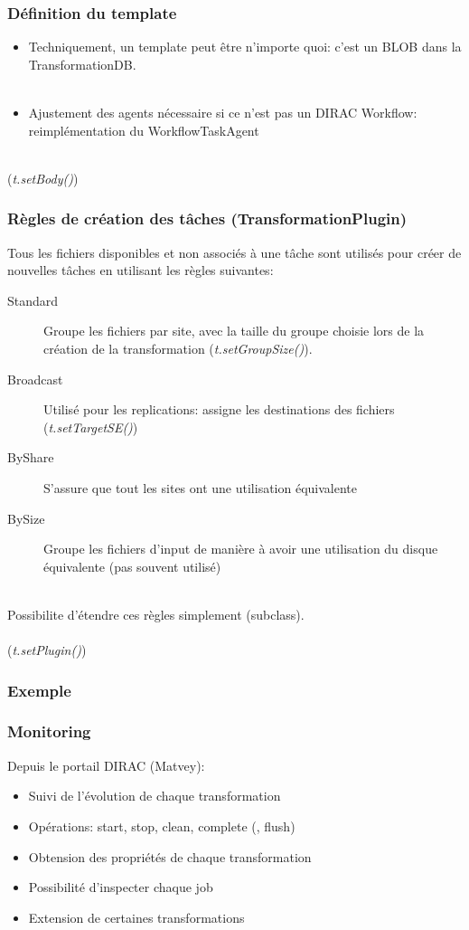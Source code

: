 \documentclass[10pt,table,dvipsnames]{beamer}
\begin{document}
\begin{frame}
  \frametitle{D\'efinition du template}
  \begin{itemize}
  \item Techniquement, un template peut \^etre n'importe quoi: c'est un BLOB
dans la TransformationDB. \\
~\\
  \item Ajustement des agents n\'ecessaire si ce n'est pas un DIRAC
    Workflow: reimpl\'ementation du WorkflowTaskAgent
  \end{itemize}

~\\

(\emph{t.setBody()})
\end{frame}

\begin{frame}
  \frametitle{R\`egles de cr\'eation des t\^aches (TransformationPlugin)}
Tous les fichiers disponibles et non associ\'es \`a une t\^ache sont utilis\'es
pour cr\'eer de nouvelles t\^aches en utilisant les r\`egles suivantes:
  \begin{description}
  \item[Standard] Groupe les fichiers par site, avec la taille du
    groupe choisie lors de la cr\'eation de la transformation
    (\emph{t.setGroupSize()}).
  \item[Broadcast] Utilis\'e pour les replications: assigne les
    destinations des fichiers (\emph{t.setTargetSE()})
  \item[ByShare] S'assure que tout les sites ont une
    utilisation \'equivalente
  \item[BySize] Groupe les fichiers d'input de mani\`ere \`a avoir une
    utilisation du disque \'equivalente (pas souvent utilis\'e)
  \end{description}
~\\
Possibilite d'\'etendre ces r\`egles simplement (subclass). \\

~\\

(\emph{t.setPlugin()})
\end{frame}

\begin{frame} 
  \frametitle{Exemple}
 
\end{frame}

\begin{frame}
  \frametitle{Monitoring}
Depuis le portail DIRAC (Matvey): 
\begin{itemize}
\item Suivi de l'\'evolution de chaque transformation
\item Op\'erations: start, stop, clean, complete (, flush) 
\item Obtension des propri\'et\'es de chaque transformation
\item Possibilit\'e d'inspecter chaque job 
\item Extension de certaines transformations
\end{itemize}
\end{frame}
\end{document}
